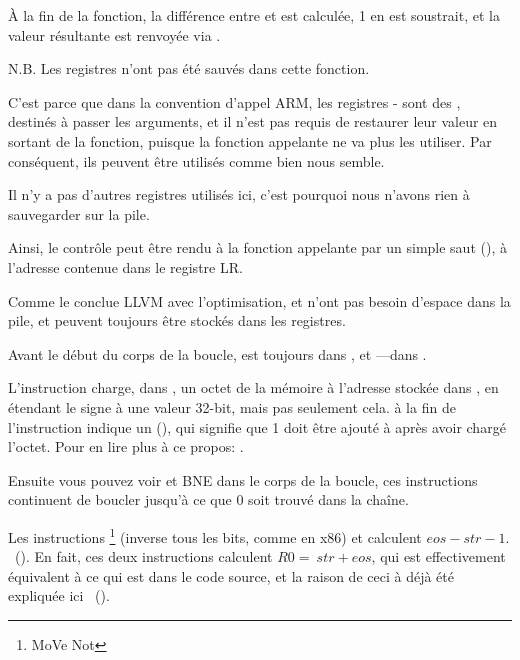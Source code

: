 À la fin de la fonction, la différence entre  et  est calculée,
1 en est soustrait, et la valeur résultante est renvoyée via .

N.B. Les registres n'ont pas été sauvés dans cette fonction.

C'est parce que dans la convention d'appel ARM, les registres - sont
des , destinés à passer les arguments, et il n'est pas requis
de restaurer leur valeur en sortant de la fonction, puisque  la fonction appelante
ne va plus les utiliser.
Par conséquent, ils peuvent être utilisés comme bien nous semble.

Il n'y a pas d'autres registres utilisés ici, c'est pourquoi nous n'avons rien à
sauvegarder sur la pile.

Ainsi, le contrôle peut être rendu à la fonction appelante par un simple saut (),
à l'adresse contenue dans le registre \ac{LR}.

\mysubparagraph{\OptimizingXcodeIV (\ThumbMode)}



Comme le conclue LLVM avec l'optimisation,  et  n'ont pas besoin
d'espace dans la pile, et peuvent toujours être stockés dans les registres.

Avant le début du corps de la boucle,  est toujours dans , et
---dans .

L'instruction  charge, dans , un octet de la mémoire
à l'adresse stockée dans , en étendant le signe à une valeur 32-bit, mais
pas seulement cela.
 à la fin de l'instruction indique un  (),
qui signifie que 1 doit être ajouté à  après avoir chargé l'octet.
Pour en lire plus à ce propos: .

Ensuite vous pouvez voir \CMP et \ac{BNE} dans le corps de la boucle, ces instructions
continuent de boucler jusqu'à ce que 0 soit trouvé dans la chaîne.

Les instructions \footnote{MoVe Not} (inverse tous les bits, comme \NOT
en x86) et \ADD calculent $eos - str - 1$.
~().
En fait, ces deux instructions calculent $R0 = ~str + eos$, qui est effectivement
équivalent à ce qui est dans le code source, et la raison de ceci à déjà été expliquée
ici ~().

